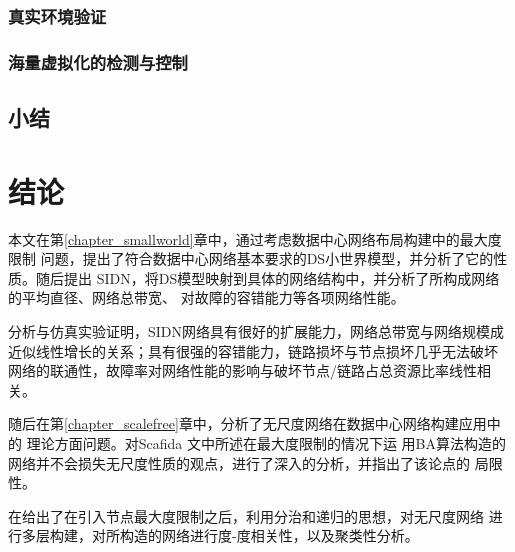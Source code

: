 \documentclass[master]{njuthesis}
\begin{document}
\subsection{真实环境验证}
\Blindtext
\subsection{海量虚拟化的检测与控制}
\Blindtext
\section{小结}
\blindtext

\chapter{结论}\label{chapter_concludes}

本文在第\ref{chapter_smallworld}章中，通过考虑数据中心网络布局构建中的最大度限制
问题，提出了符合数据中心网络基本要求的DS小世界模型，并分析了它的性质。随后提出
SIDN，将DS模型映射到具体的网络结构中，并分析了所构成网络的平均直径、网络总带宽、
对故障的容错能力等各项网络性能。

分析与仿真实验证明，SIDN网络具有很好的扩展能力，网络总带宽与网络规模成
近似线性增长的关系；具有很强的容错能力，链路损坏与节点损坏几乎无法破坏
网络的联通性，故障率对网络性能的影响与破坏节点/链路占总资源比率线性相关。

随后在第\ref{chapter_scalefree}章中，分析了无尺度网络在数据中心网络构建应用中的
理论方面问题。对Scafida \cite{gyarmati2010scafida}文中所述在最大度限制的情况下运
用BA算法构造的网络并不会损失无尺度性质的观点，进行了深入的分析，并指出了该论点的
局限性。

在给出了在引入节点最大度限制之后，利用分治和递归的思想，对无尺度网络
进行多层构建，对所构造的网络进行度-度相关性，以及聚类性分析。
\end{document}
